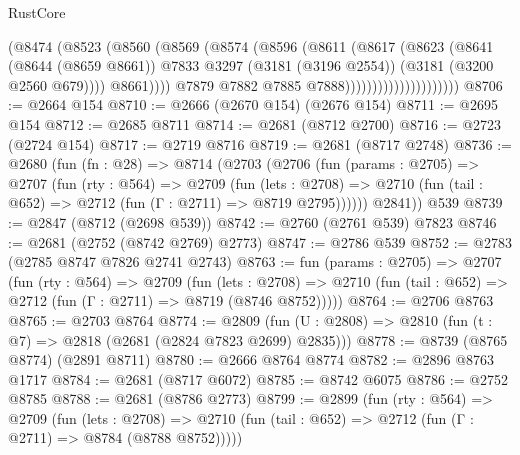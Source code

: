 \begin{lexlean}{RustCore}
\begin{coremodule}
                                      (@8474
                                        (@8523
                                          (@8560
                                            (@8569
                                              (@8574
                                                (@8596
                                                  (@8611
                                                    (@8617
                                                      (@8623
                                                        (@8641
                                                          (@8644 (@8659 @8661))
                                                          @7833
                                                          @3297
                                                          (@3181 (@3196 @2554))
                                                          (@3181 (@3200 @2560 @679))))
                                                      @8661))))
                                              @7879
                                              @7882
                                              @7885
                                              @7888)))))))))))))))))))))
@8706 := @2664 @154
@8710 := @2666 (@2670 @154) (@2676 @154)
@8711 := @2695 @154
@8712 := @2685 @8711
@8714 := @2681 (@8712 @2700)
@8716 := @2723 (@2724 @154)
@8717 := @2719 @8716
@8719 := @2681 (@8717 @2748)
@8736 := @2680
    (fun (fn : @28) =>
    @8714
      (@2703
        (@2706
          (fun (params : @2705) =>
          @2707
            (fun (rty : @564) =>
            @2709
              (fun (lets : @2708) =>
              @2710 (fun (tail : @652) => @2712 (fun (Γ : @2711) => @8719 @2795))))))
        @2841))
    @539
@8739 := @2847 (@8712 (@2698 @539))
@8742 := @2760 (@2761 @539) @7823
@8746 := @2681 (@2752 (@8742 @2769) @2773)
@8747 := @2786 @539
@8752 := @2783 (@2785 @8747 @7826 @2741 @2743)
@8763 := fun (params : @2705) =>
  @2707
    (fun (rty : @564) =>
    @2709
      (fun (lets : @2708) =>
      @2710 (fun (tail : @652) => @2712 (fun (Γ : @2711) => @8719 (@8746 @8752)))))
@8764 := @2706 @8763
@8765 := @2703 @8764
@8774 := @2809 (fun (U : @2808) => @2810 (fun (t : @7) => @2818 (@2681 (@2824 @7823 @2699) @2835)))
@8778 := @8739 (@8765 @8774) (@2891 @8711)
@8780 := @2666 @8764 @8774
@8782 := @2896 @8763 @1717
@8784 := @2681 (@8717 @6072)
@8785 := @8742 @6075
@8786 := @2752 @8785
@8788 := @2681 (@8786 @2773)
@8799 := @2899
    (fun (rty : @564) =>
    @2709
      (fun (lets : @2708) =>
      @2710 (fun (tail : @652) => @2712 (fun (Γ : @2711) => @8784 (@8788 @8752)))))

\end{coremodule}
\end{lexlean}
